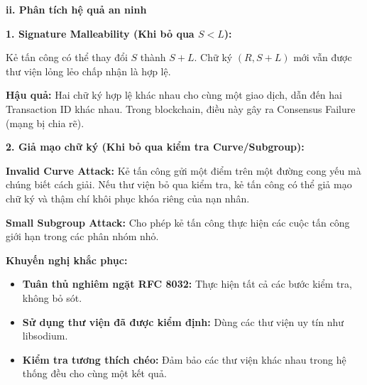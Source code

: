 \textbf{ii. Phân tích hệ quả an ninh}

\textbf{1. Signature Malleability (Khi bỏ qua $S < L$):}

Kẻ tấn công có thể thay đổi $S$ thành $S + L$. Chữ ký $(R, S+L)$ mới vẫn được thư viện lỏng lẻo chấp nhận là hợp lệ.

\textbf{Hậu quả:} Hai chữ ký hợp lệ khác nhau cho cùng một giao dịch, dẫn đến hai Transaction ID khác nhau. Trong blockchain, điều này gây ra Consensus Failure (mạng bị chia rẽ).

\textbf{2. Giả mạo chữ ký (Khi bỏ qua kiểm tra Curve/Subgroup):}

\textbf{Invalid Curve Attack:} Kẻ tấn công gửi một điểm trên một đường cong yếu mà chúng biết cách giải. Nếu thư viện bỏ qua kiểm tra, kẻ tấn công có thể giả mạo chữ ký và thậm chí khôi phục khóa riêng của nạn nhân.

\textbf{Small Subgroup Attack:} Cho phép kẻ tấn công thực hiện các cuộc tấn công giới hạn trong các phân nhóm nhỏ.

\textbf{Khuyến nghị khắc phục:}
\begin{itemize}
    \item \textbf{Tuân thủ nghiêm ngặt RFC 8032:} Thực hiện tất cả các bước kiểm tra, không bỏ sót.
    
    \item \textbf{Sử dụng thư viện đã được kiểm định:} Dùng các thư viện uy tín như libsodium.
    
    \item \textbf{Kiểm tra tương thích chéo:} Đảm bảo các thư viện khác nhau trong hệ thống đều cho cùng một kết quả.
\end{itemize}
